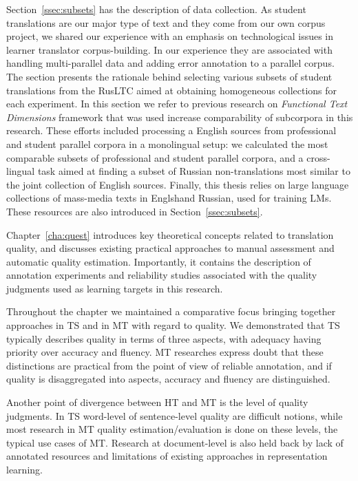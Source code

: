 Section~\ref{ssec:subsets} has the description of data collection. As student translations are our major type of text and they come from our own corpus project, we shared our experience with an emphasis on technological issues in learner translator corpus-building. In our experience they are associated with handling multi-parallel data and adding error annotation to a parallel corpus. The section presents the rationale behind selecting various subsets of student translations from the \gls{RusLTC} aimed at obtaining homogeneous collections for each experiment. 
In this section we refer to previous research on \textit{Functional Text Dimensions} framework that was used increase comparability of subcorpora in this research. 
These efforts included processing a English sources from professional and student parallel corpora in a monolingual setup: we calculated the most comparable subsets of professional and student parallel corpora, and a cross-lingual task aimed at finding a subset of Russian non-translations most similar to the joint collection of English sources. 
Finally, this thesis relies on large language collections of mass-media texts in Englshand Russian, used for training LMs. These resources are also introduced in Section~\ref{ssec:subsets}.

Chapter~\ref{cha:quest} introduces key theoretical concepts related to translation quality, and discusses existing practical approaches to manual assessment and automatic quality estimation. Importantly, it contains the description of annotation experiments and reliability studies associated with the quality judgments used as learning targets in this research. 

Throughout the chapter we maintained a comparative focus bringing together approaches in TS and in MT with regard to quality. We demonstrated that TS typically describes quality in terms of three aspects, with adequacy having priority over accuracy and fluency. MT researches express doubt that these distinctions are practical from the point of view of reliable annotation, and if quality is disaggregated into aspects, accuracy and fluency are distinguished. 

Another point of divergence between HT and MT is the level of quality judgments. In TS word-level of sentence-level quality are difficult notions, while most research in MT quality estimation/evaluation is done on these levels, the typical use cases of MT. Research at document-level is also held back by lack of annotated resources and limitations of existing approaches in representation learning. 

